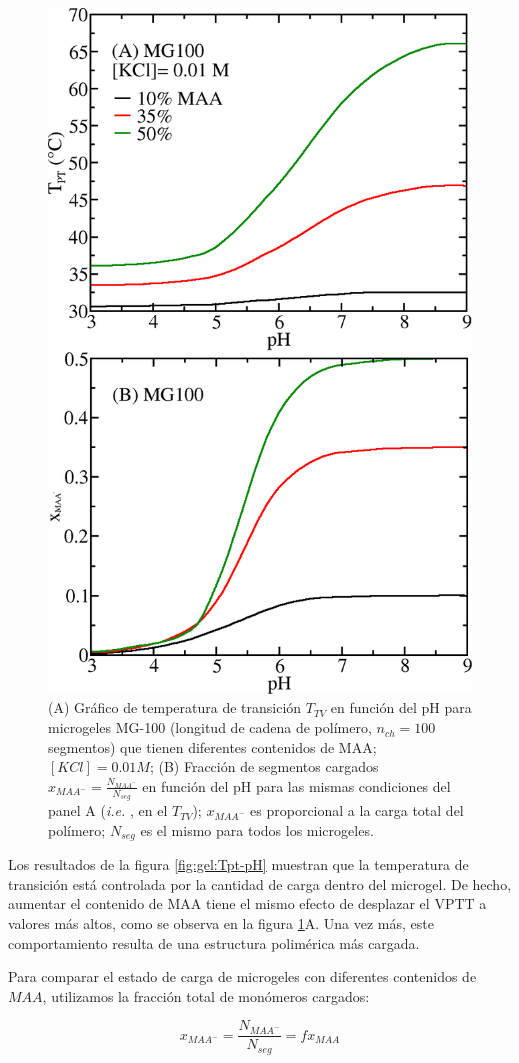 \begin{figure}[!tb]
	\centering
	\includegraphics[width=0.55\linewidth]{Figures/graph-gel/Tpt-pH_MAA.png}
	\caption{(A) Gr\'afico de temperatura de transici\'on $T_{TV}$ en funci\'on del pH para microgeles MG-100 (longitud de cadena de pol\'imero, $n_{ch}=100$ segmentos) que tienen diferentes contenidos de MAA; $[KCl]=0.01 M$;
	(B) Fracci\'on de segmentos cargados $x_{MAA^-}=\frac{N_{MAA^-}}{N_{seg}}$ en funci\'on del pH para las mismas condiciones del panel A (\emph{i.e.} , en el $T_{TV}$); $x_{MAA^-}$ es proporcional a la carga total del pol\'imero; $N_{seg}$ es el mismo para todos los microgeles.}
	\label{fig:gel:Tpt_MAA}
\end{figure}

Los resultados de la figura \ref{fig:gel:Tpt-pH} muestran que la temperatura de transici\'on est\'a controlada por la cantidad de carga dentro del microgel. De hecho, aumentar el contenido de MAA tiene el mismo efecto de desplazar el VPTT a valores m\'as altos, como se observa en la figura \ref{fig:gel:Tpt_MAA}A. Una vez m\'as, este comportamiento resulta de una estructura polim\'erica m\'as cargada.

Para comparar el estado de carga de microgeles con diferentes contenidos de $MAA$, utilizamos la fracci\'on total de mon\'omeros cargados:

\begin{equation}
	x_{MAA^-}=\frac{N_{MAA^-}}{N_{seg}}=f x_{MAA}
\end{equation}


